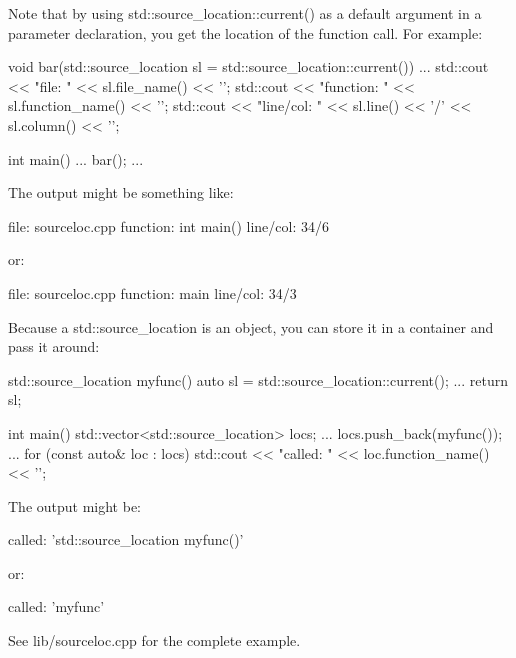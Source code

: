 Note that by using std::source\_location::current() as a default argument in a parameter declaration, you get the location of the function call. For example:

\begin{cpp}
void bar(std::source_location sl = std::source_location::current())
{
	...
	std::cout << "file: " << sl.file_name() << '\n';
	std::cout << "function: " << sl.function_name() << '\n';
	std::cout << "line/col: " << sl.line() << '/' << sl.column() << '\n';
}

int main()
{
	...
	bar();
	...
}
\end{cpp}

The output might be something like:

\begin{shell}
file:     sourceloc.cpp
function: int main()
line/col: 34/6
\end{shell}

or:

\begin{shell}
file:     sourceloc.cpp
function: main
line/col: 34/3
\end{shell}

Because a std::source\_location is an object, you can store it in a container and pass it around:

\begin{cpp}
std::source_location myfunc()
{
	auto sl = std::source_location::current();
	...
	return sl;
}

int main()
{
	std::vector<std::source_location> locs;
	...
	locs.push_back(myfunc());
	...
	for (const auto& loc : locs) {
		std::cout << "called: " << loc.function_name() << '\n';
	}
}
\end{cpp}

The output might be:

\begin{shell}
called: ’std::source_location myfunc()’
\end{shell}

or:

\begin{shell}
called: ’myfunc’
\end{shell}

See lib/sourceloc.cpp for the complete example.


















